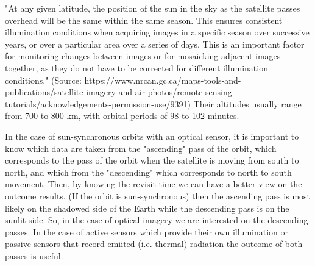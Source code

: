 "At any given latitude, the position of the sun in the sky as the satellite passes overhead will be the same within the same season. This ensures consistent illumination conditions when acquiring images in a specific season over successive years, or over a particular area over a series of days. This is an important factor for monitoring changes between images or for mosaicking adjacent images together, as they do not have to be corrected for different illumination conditions." (Source: https://www.nrcan.gc.ca/maps-tools-and-publications/satellite-imagery-and-air-photos/remote-sensing-tutorials/acknowledgements-permission-use/9391)
Their altitudes usually range from 700 to 800 km, with orbital periods of 98 to 102 minutes.

In the case of sun-synchronous orbits with an optical sensor, it is important to know which data are taken from the "ascending" pass of the orbit, which corresponds to the pass of the orbit when the satellite is moving from south to north, and which from the "descending" which corresponds to north to south movement. Then, by knowing the revisit time we can have a better view on the outcome results. (If the orbit is sun-synchronous) then the ascending pass is most likely on the shadowed side of the Earth while the descending pass is on the sunlit side. So, in the case of optical imagery we are interested on the descending passes. In the case of active sensors which provide their own illumination or passive sensors that record emiited (i.e. thermal) radiation the outcome of both passes is useful.


